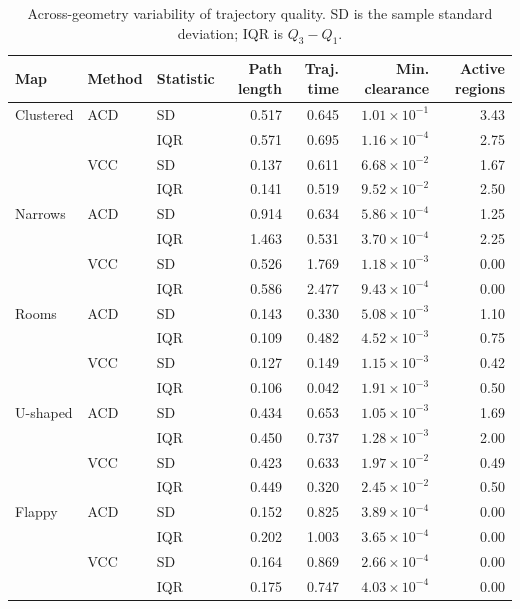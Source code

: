 \begin{table}[htbp]
\caption{Across-geometry variability of trajectory quality. SD is the sample standard deviation; IQR is $Q_3-Q_1$.}
\label{tab:exp-quality-var}
\centering
\scriptsize
\setlength{\tabcolsep}{4.0pt}
\begin{tabular}{@{}lllrrrr@{}}
\toprule
Map & Method & Statistic & Path length & Traj. time & Min. clearance & Active regions \\
\midrule
Clustered & ACD & SD  & 0.517 & 0.645 & $1.01{\times}10^{-1}$ & 3.43 \\
          &     & IQR & 0.571 & 0.695 & $1.16{\times}10^{-4}$ & 2.75 \\
          & VCC & SD  & 0.137 & 0.611 & $6.68{\times}10^{-2}$ & 1.67 \\
          &     & IQR & 0.141 & 0.519 & $9.52{\times}10^{-2}$ & 2.50 \\
Narrows   & ACD & SD  & 0.914 & 0.634 & $5.86{\times}10^{-4}$ & 1.25 \\
          &     & IQR & 1.463 & 0.531 & $3.70{\times}10^{-4}$ & 2.25 \\
          & VCC & SD  & 0.526 & 1.769 & $1.18{\times}10^{-3}$ & 0.00 \\
          &     & IQR & 0.586 & 2.477 & $9.43{\times}10^{-4}$ & 0.00 \\
Rooms     & ACD & SD  & 0.143 & 0.330 & $5.08{\times}10^{-3}$ & 1.10 \\
          &     & IQR & 0.109 & 0.482 & $4.52{\times}10^{-3}$ & 0.75 \\
          & VCC & SD  & 0.127 & 0.149 & $1.15{\times}10^{-3}$ & 0.42 \\
          &     & IQR & 0.106 & 0.042 & $1.91{\times}10^{-3}$ & 0.50 \\
U-shaped  & ACD & SD  & 0.434 & 0.653 & $1.05{\times}10^{-3}$ & 1.69 \\
          &     & IQR & 0.450 & 0.737 & $1.28{\times}10^{-3}$ & 2.00 \\
          & VCC & SD  & 0.423 & 0.633 & $1.97{\times}10^{-2}$ & 0.49 \\
          &     & IQR & 0.449 & 0.320 & $2.45{\times}10^{-2}$ & 0.50 \\
Flappy    & ACD & SD  & 0.152 & 0.825 & $3.89{\times}10^{-4}$ & 0.00 \\
          &     & IQR & 0.202 & 1.003 & $3.65{\times}10^{-4}$ & 0.00 \\
          & VCC & SD  & 0.164 & 0.869 & $2.66{\times}10^{-4}$ & 0.00 \\
          &     & IQR & 0.175 & 0.747 & $4.03{\times}10^{-4}$ & 0.00 \\
\bottomrule
\end{tabular}
\end{table}

